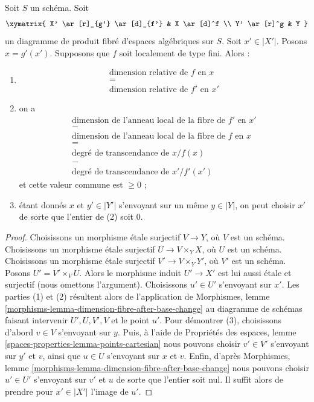 \begin{lemma}
\label{lemma-dimension-fibre-after-base-change}
Soit $S$ un schéma. Soit
$$
\xymatrix{
X' \ar[r]_{g'} \ar[d]_{f'} & X \ar[d]^f \\
Y' \ar[r]^g & Y
}
$$
un diagramme de produit fibré d'espaces algébriques sur $S$.
Soit $x' \in |X'|$. Posons $x = g'(x')$. Supposons que $f$ soit localement de type fini.
Alors :
\begin{enumerate}
\item
$$
\begin{matrix}
\text{dimension relative de }f\text{ en }x \\
= \\
\text{dimension relative de }f'\text{ en }x'
\end{matrix}
$$
\item on a
$$
\begin{matrix}
\text{dimension de l'anneau local de la fibre de }f'\text{ en }x' \\
- \\
\text{dimension de l'anneau local de la fibre de }f\text{ en }x \\
= \\
\text{degré de transcendance de }x/f(x) \\
- \\
\text{degré de transcendance de }x'/f'(x')
\end{matrix}
$$
et cette valeur commune est $\geq 0$ ;
\item étant donnés $x$ et $y' \in |Y'|$ s'envoyant sur un même $y \in |Y|$,
on peut choisir $x'$ de sorte que l'entier de (2) soit $0$.
\end{enumerate}
\end{lemma}

\begin{proof}
Choisissons un morphisme étale surjectif $V \to Y$, où $V$ est un schéma.
Choisissons un morphisme étale surjectif $U \to V \times_Y X$, où $U$ est un schéma.
Choisissons un morphisme étale surjectif $V' \to V \times_Y Y'$, où $V'$ est un schéma.
Posons $U' = V' \times_V U$.
Alors le morphisme induit $U' \to X'$ est lui aussi étale et
surjectif (nous omettons l'argument). Choisissons $u' \in U'$
s'envoyant sur $x'$. Les parties (1) et (2) résultent alors de l'application de
Morphismes, lemme \ref{morphisms-lemma-dimension-fibre-after-base-change}
au diagramme de schémas faisant intervenir $U', U, V', V$ et le point $u'$.
Pour démontrer (3), choisissons d'abord $v \in V$ s'envoyant sur $y$.
Puis, à l'aide de Propriétés des espaces, lemme
\ref{spaces-properties-lemma-points-cartesian}
nous pouvons choisir $v' \in V'$ s'envoyant sur $y'$ et $v$, ainsi que
$u \in U$ s'envoyant sur $x$ et $v$. Enfin, d'après
Morphismes, lemme \ref{morphisms-lemma-dimension-fibre-after-base-change}
nous pouvons choisir $u' \in U'$ s'envoyant sur $v'$ et $u$ de sorte que
l'entier soit nul. Il suffit alors de prendre pour $x' \in |X'|$ l'image de $u'$.
\end{proof}

